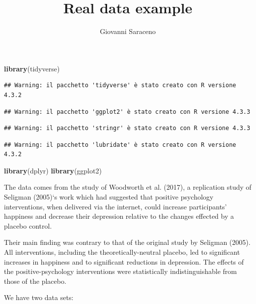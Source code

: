 \documentclass[
]{article}
\title{Real data example}
\author{Giovanni Saraceno}
\date{}
\newenvironment{Shaded}{\begin{snugshade}}{\end{snugshade}}
\newcommand{\FunctionTok}[1]{\textcolor[rgb]{0.13,0.29,0.53}{\textbf{#1}}}
\newcommand{\NormalTok}[1]{#1}
\begin{document}
\maketitle

{
\setcounter{tocdepth}{2}
\tableofcontents
}
\begin{Shaded}
\begin{Highlighting}[]
\FunctionTok{library}\NormalTok{(tidyverse)}
\end{Highlighting}
\end{Shaded}

\begin{verbatim}
## Warning: il pacchetto 'tidyverse' è stato creato con R versione 4.3.2
\end{verbatim}

\begin{verbatim}
## Warning: il pacchetto 'ggplot2' è stato creato con R versione 4.3.3
\end{verbatim}

\begin{verbatim}
## Warning: il pacchetto 'stringr' è stato creato con R versione 4.3.3
\end{verbatim}

\begin{verbatim}
## Warning: il pacchetto 'lubridate' è stato creato con R versione 4.3.2
\end{verbatim}

\begin{Shaded}
\begin{Highlighting}[]
\FunctionTok{library}\NormalTok{(dplyr)}
\FunctionTok{library}\NormalTok{(ggplot2)}
\end{Highlighting}
\end{Shaded}

The data comes from the study of Woodworth et al. (2017), a replication
study of Seligman (2005)`s work which had suggested that positive
psychology interventions, when delivered via the internet, could
increase participants' happiness and decrease their depression relative
to the changes effected by a placebo control.

Their main finding was contrary to that of the original study by
Seligman (2005). All interventions, including the theoretically-neutral
placebo, led to significant increases in happiness and to significant
reductions in depression. The effects of the positive-psychology
interventions were statistically indistinguishable from those of the
placebo.

We have two data sets:
\end{document}
